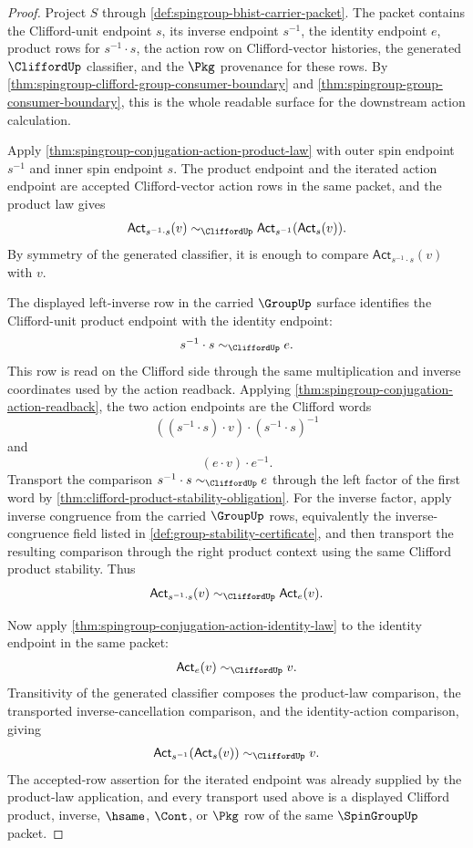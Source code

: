 \begin{proof}
Project $S$ through \autoref{def:spingroup-bhist-carrier-packet}. The packet
contains the Clifford-unit endpoint $s$, its inverse endpoint $s^{-1}$, the
identity endpoint $e$, product rows for $s^{-1}\cdot s$, the action row on
Clifford-vector histories, the generated $\CliffordUp$ classifier, and the
$\Pkg$ provenance for these rows. By
\autoref{thm:spingroup-clifford-group-consumer-boundary} and
\autoref{thm:spingroup-group-consumer-boundary}, this is the whole readable
surface for the downstream action calculation.

Apply \autoref{thm:spingroup-conjugation-action-product-law} with outer spin
endpoint $s^{-1}$ and inner spin endpoint $s$. The product endpoint and the
iterated action endpoint are accepted Clifford-vector action rows in the same
packet, and the product law gives
$$
\mathsf{Act}_{s^{-1}\cdot s}(v)
\sim_{\CliffordUp}
\mathsf{Act}_{s^{-1}}(\mathsf{Act}_{s}(v)).
$$
By symmetry of the generated classifier, it is enough to compare
$\mathsf{Act}_{s^{-1}\cdot s}(v)$ with $v$.

The displayed left-inverse row in the carried $\GroupUp$ surface identifies the
Clifford-unit product endpoint with the identity endpoint:
$$
s^{-1}\cdot s\sim_{\CliffordUp}e.
$$
This row is read on the Clifford side through the same multiplication and
inverse coordinates used by the action readback. Applying
\autoref{thm:spingroup-conjugation-action-readback}, the two action endpoints
are the Clifford words
$$
((s^{-1}\cdot s)\cdot v)\cdot (s^{-1}\cdot s)^{-1}
$$
and
$$
(e\cdot v)\cdot e^{-1}.
$$
Transport the comparison $s^{-1}\cdot s\sim_{\CliffordUp}e$ through the left
factor of the first word by \autoref{thm:clifford-product-stability-obligation}.
For the inverse factor, apply inverse congruence from the carried $\GroupUp$
rows, equivalently the inverse-congruence field listed in
\autoref{def:group-stability-certificate}, and then transport the resulting
comparison through the right product context using the same Clifford product
stability. Thus
$$
\mathsf{Act}_{s^{-1}\cdot s}(v)
\sim_{\CliffordUp}
\mathsf{Act}_{e}(v).
$$

Now apply \autoref{thm:spingroup-conjugation-action-identity-law} to the
identity endpoint in the same packet:
$$
\mathsf{Act}_{e}(v)\sim_{\CliffordUp}v.
$$
Transitivity of the generated classifier composes the product-law comparison,
the transported inverse-cancellation comparison, and the identity-action
comparison, giving
$$
\mathsf{Act}_{s^{-1}}(\mathsf{Act}_{s}(v))\sim_{\CliffordUp}v.
$$
The accepted-row assertion for the iterated endpoint was already supplied by
the product-law application, and every transport used above is a displayed
Clifford product, inverse, $\hsame$, $\Cont$, or $\Pkg$ row of the same
$\SpinGroupUp$ packet.
\end{proof}

